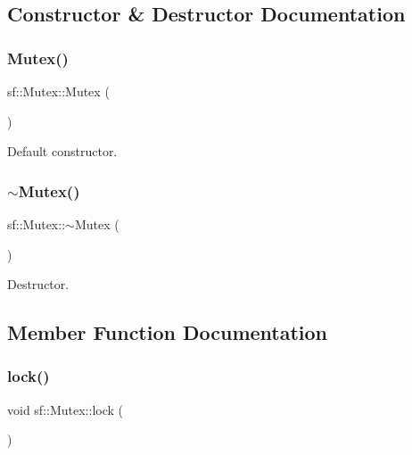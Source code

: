 \subsection{Constructor \& Destructor Documentation}
\mbox{\label{classsf_1_1_mutex_a9bd52a48320fd7b6db8a78037aad276e}} 
\subsubsection{\texorpdfstring{Mutex()}{Mutex()}}
{\footnotesize\ttfamily sf\+::\+Mutex\+::\+Mutex (\begin{DoxyParamCaption}{ }\end{DoxyParamCaption})}



Default constructor. 

\begin{DoxyVerb}\end{DoxyVerb}
 \mbox{\label{classsf_1_1_mutex_a9f76a67b7b6d3918131a692179b4e3f2}} 
\subsubsection{\texorpdfstring{$\sim$Mutex()}{~Mutex()}}
{\footnotesize\ttfamily sf\+::\+Mutex\+::$\sim$\+Mutex (\begin{DoxyParamCaption}{ }\end{DoxyParamCaption})}



Destructor. 

\begin{DoxyVerb}\end{DoxyVerb}
 

\subsection{Member Function Documentation}
\mbox{\label{classsf_1_1_mutex_a1a16956a6bbea764480c1b80f2e45763}} 
\subsubsection{\texorpdfstring{lock()}{lock()}}
{\footnotesize\ttfamily void sf\+::\+Mutex\+::lock (\begin{DoxyParamCaption}{ }\end{DoxyParamCaption})}



